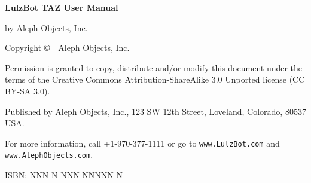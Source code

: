 \clearpage\null\vfill
\begingroup 
\thispagestyle{empty}
\footnotesize\raggedright
\setlength{\parskip}{0.5\baselineskip}

\textbf{LulzBot\textsuperscript{\miniscule{\texttrademark}} TAZ User Manual}

by Aleph Objects, Inc.

Copyright \copyright\ \the\year\ Aleph Objects, Inc.\par
Permission is granted to copy, distribute and\slash or modify 
this document under the terms of the
Creative Commons Attribution-ShareAlike 3.0 Unported license
(CC BY-SA 3.0).

Published by Aleph Objects, Inc., 123 SW 12th Street, Loveland, Colorado, 80537 USA.

For more information, call +1-970-377-1111 or go to \texttt{www.LulzBot.com} and \texttt{www.AlephObjects.com}.

ISBN: NNN-N-NNN-NNNNN-N
\hfill\texttt{\the\year\the\month\the\day}
\endgroup
\pagebreak{}
